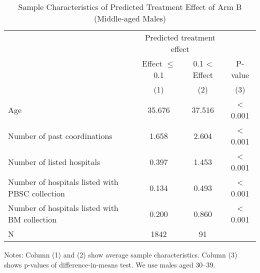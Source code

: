 \documentclass[12pt, a4paper]{article}
\begin{document}
\begin{table}[H]

\caption{\label{tab:rcf-middle-male}Sample Characteristics of Predicted Treatment Effect of Arm B (Middle-aged Males)}
\centering
\fontsize{9}{11}\selectfont
\fontsize{9}{11}\selectfont
\begin{threeparttable}
\begin{tabular}[t]{lccc}
\toprule
\multicolumn{1}{c}{ } & \multicolumn{2}{c}{Predicted treatment effect} & \multicolumn{1}{c}{ } \\
\cmidrule(l{3pt}r{3pt}){2-3}
\multicolumn{1}{c}{ } & \multicolumn{1}{c}{Effect $\le$ 0.1} & \multicolumn{1}{c}{0.1 < Effect} & \multicolumn{1}{c}{P-value} \\
\cmidrule(l{3pt}r{3pt}){2-2} \cmidrule(l{3pt}r{3pt}){3-3} \cmidrule(l{3pt}r{3pt}){4-4}
 & (1) & (2) & (3)\\
\midrule
Age & 35.676 & 37.516 & < 0.001\\
Number of past coordinations & 1.658 & 2.604 & < 0.001\\
Number of listed hospitals & 0.397 & 1.453 & < 0.001\\
Number of hospitals listed with PBSC collection & 0.134 & 0.493 & < 0.001\\
Number of hospitals listed with BM collection & 0.200 & 0.860 & < 0.001\\
N & 1842 & 91 & \\
\bottomrule
\end{tabular}
\begin{tablenotes}
\item Notes: Column (1) and (2) show average sample characteristics. Column (3) shows p-values of difference-in-means test. We use males aged 30--39.
\end{tablenotes}
\end{threeparttable}
\end{table}
\end{document}
